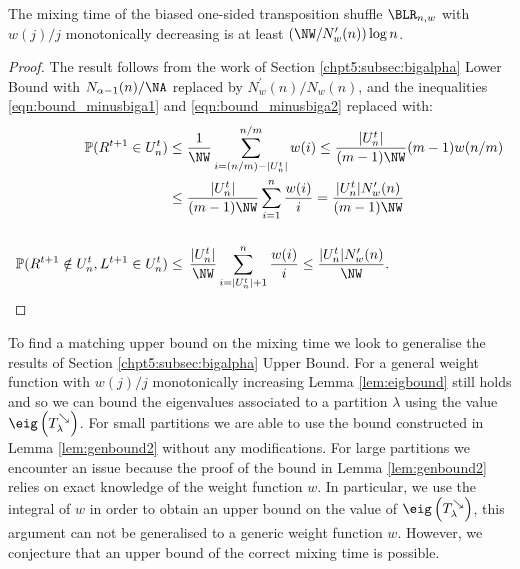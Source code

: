 \documentclass[11pt]{report}
\begin{document}
\begin{lemma}
	The mixing time of the biased one-sided transposition shuffle $\BLR_{n,w}$ with $w(j)/j$ monotonically decreasing is at least $\left(\NW / N_{w}^{\prime}(n) \right) \log n$. 
\end{lemma}
\begin{proof}
	The result follows from the work of Section \ref{chpt5:subsec:bigalpha} Lower Bound with $N_{\alpha-1}(n) /\NA$ replaced by $N_{w}^{\prime}(n) / N_{w}(n)$, and the inequalities \eqref{eqn:bound_minusbiga1} and \eqref{eqn:bound_minusbiga2} replaced with:
	\begin{align}
	\mathbb{P}(R^{t+1}\in U_n^t) & \leq \frac{1}{\NW} \sum_{i=(n/m)- 
		|U_n^t|}^{n/m} w(i)\leq  \frac{|U_{n}^{t}|}{(m-1)\NW} (m-1)w(n/m)  \nonumber \\ 
	& \leq  \frac{|U_n^t|}{(m-1)\NW} \sum_{i=1}^{n} \frac{w(i)}{i} = \frac{|U_n^t| N_{w}^{\prime}(n)}{(m-1)\NW}
	\\[0.5cm]
	\mathbb{P}(R^{t+1}\notin U_n^t,L^{t+1}\in U_n^t) & \le\, \frac{|U_n^t|}{\NW} 
	\sum_{i=|U_n^t|+1}^{n} \frac{w(i)}{i} \leq \frac{|U_n^t| N_{w}^{\prime}(n)}{\NW}.
	\end{align}
\end{proof}
To find a matching upper bound on the mixing time we look to generalise the results of Section \ref{chpt5:subsec:bigalpha} Upper Bound.
For a general weight function with $w(j)/j$ monotonically increasing  Lemma \ref{lem:eigbound} still holds and so we can bound the eigenvalues associated to a partition $\lambda$ using the value $\eig\left(T_{\lambda}^{\searrow} \right)$. For small partitions we are able to use the bound constructed in Lemma \ref{lem:genbound2} without any modifications. For large partitions we encounter an issue because the proof of the bound in Lemma \ref{lem:genbound2} relies on exact knowledge of the weight function $w$. In particular, we use the integral of $w$ in order to obtain an upper bound on the value of $\eig\left(T_{\lambda}^{\searrow} \right)$,  this argument can not be generalised to a generic weight function $w$. However, we conjecture that an upper bound of the correct mixing time is possible.
\end{document}
